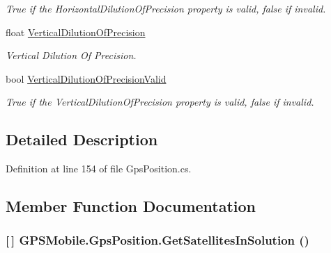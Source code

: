 \begin{DoxyCompactItemize}
\begin{DoxyCompactList}\small\item\em True if the HorizontalDilutionOfPrecision property is valid, false if invalid. \item\end{DoxyCompactList}\item 
float \hyperlink{class_g_p_s_mobile_1_1_gps_position_a5ec365b867e36ff34e3f4f9018f729a3}{VerticalDilutionOfPrecision}
\begin{DoxyCompactList}\small\item\em Vertical Dilution Of Precision. \item\end{DoxyCompactList}\item 
bool \hyperlink{class_g_p_s_mobile_1_1_gps_position_a78a856cdd3a6a5438ba96e95f52bf2b8}{VerticalDilutionOfPrecisionValid}
\begin{DoxyCompactList}\small\item\em True if the VerticalDilutionOfPrecision property is valid, false if invalid. \item\end{DoxyCompactList}\end{DoxyCompactItemize}


\subsection{Detailed Description}


Definition at line 154 of file GpsPosition.cs.

\subsection{Member Function Documentation}
\hypertarget{class_g_p_s_mobile_1_1_gps_position_a5dbc8646aecb0273e8d0a95046497591}{
\subsubsection[{GetSatellitesInSolution}]{ \mbox{[}$\,$\mbox{]} GPSMobile.GpsPosition.GetSatellitesInSolution ()}}
\label{class_g_p_s_mobile_1_1_gps_position_a5dbc8646aecb0273e8d0a95046497591}


